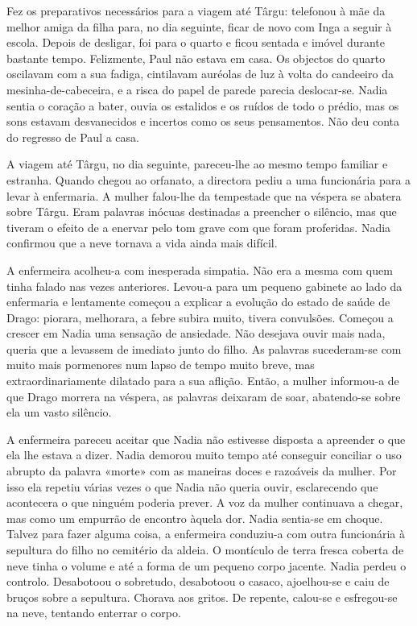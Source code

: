 Fez os preparativos necessários para a viagem até Târgu: telefonou à mãe
da melhor amiga da filha para, no dia seguinte, ficar de novo com Inga a
seguir à escola. Depois de desligar, foi para o quarto e ficou sentada e
imóvel durante bastante tempo. Felizmente, Paul não estava em casa. Os
objectos do quarto oscilavam com a sua fadiga, cintilavam auréolas de
luz à volta do candeeiro da mesinha-de-cabeceira, e a risca do papel de
parede parecia deslocar-se. Nadia sentia o coração a bater, ouvia os
estalidos e os ruídos de todo o prédio, mas os sons estavam desvanecidos
e incertos como os seus pensamentos. Não deu conta do regresso de Paul
a casa.

A viagem até Târgu, no dia seguinte, pareceu-lhe ao mesmo tempo familiar
e estranha. Quando chegou ao orfanato, a directora pediu a uma
funcionária para a levar à enfermaria. A mulher falou-lhe da tempestade
que na véspera se abatera sobre Târgu. Eram palavras inócuas destinadas
a preencher o silêncio, mas que tiveram o efeito de a enervar pelo tom
grave com que foram proferidas. Nadia confirmou que a neve tornava a
vida ainda mais difícil.

A enfermeira acolheu-a com inesperada simpatia. Não era a mesma com quem
tinha falado nas vezes anteriores. Levou-a para um pequeno gabinete ao
lado da enfermaria e lentamente começou a explicar a evolução do estado
de saúde de Drago: piorara, melhorara, a febre subira muito, tivera
convulsões. Começou a crescer em Nadia uma sensação de ansiedade. Não
desejava ouvir mais nada, queria
que a levassem de imediato junto do filho. As palavras sucederam-se com
muito mais pormenores num lapso de tempo muito breve, mas
extraordinariamente dilatado para a sua aflição. Então, a mulher
informou-a de que Drago morrera na véspera, as palavras deixaram de
soar, abatendo-se sobre ela um vasto silêncio.

A enfermeira pareceu aceitar que Nadia não estivesse disposta a
apreender o que ela lhe estava a dizer. Nadia demorou muito tempo até
conseguir conciliar o uso abrupto da palavra «morte» com as maneiras
doces e razoáveis da mulher. Por isso ela repetiu várias vezes o que
Nadia não queria ouvir, esclarecendo que acontecera o que ninguém
poderia prever. A voz da mulher continuava a chegar, mas como um
empurrão de encontro àquela dor. Nadia sentia-se em choque. Talvez para
fazer alguma coisa, a enfermeira conduziu-a com outra funcionária à
sepultura do filho no cemitério da aldeia. O montículo de terra fresca
coberta de neve tinha o volume e até a forma de um pequeno corpo
jacente. Nadia perdeu o controlo. Desabotoou o sobretudo, desabotoou o
casaco, ajoelhou-se e caiu de bruços sobre a sepultura. Chorava aos
gritos. De repente, calou-se e esfregou-se na neve, tentando enterrar o
corpo.

